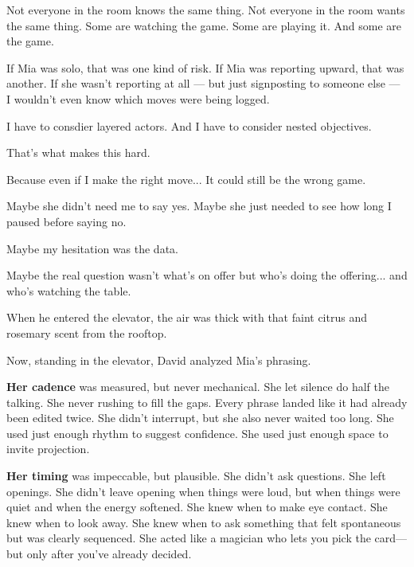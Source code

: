 \begin{tcolorbox}[
    enhanced,
    sharp corners,
    boxrule=0pt,
    colback=gray!3,
    borderline west={2pt}{0pt}{gray!60}, %
    left=10pt,
    right=10pt,
    top=6pt,
    bottom=6pt,
    width=\linewidth,
    fontupper=\small\itshape
  ]
Not everyone in the room knows the same thing.
Not everyone in the room wants the same thing.
Some are watching the game.
Some are playing it.
And some are the game.

\medskip

If Mia was solo, that was one kind of risk.
If Mia was reporting upward, that was another.
If she wasn’t reporting at all --- but just signposting to someone else --- I wouldn’t 
even know which moves were being logged.

\medskip

I have to consdier layered actors. 
And I have to consider nested objectives.

\medskip

That’s what makes this hard.

\medskip

Because even if I make the right move...
It could still be the wrong game.

\medskip

Maybe she didn’t need me to say yes.
Maybe she just needed to see how long I paused before saying no.

\medskip

Maybe my hesitation was the data.

\medskip

Maybe the real question wasn’t what’s on offer
but who’s doing the offering... and who’s watching the table.

\end{tcolorbox}

When he entered the elevator, the air was thick with that faint citrus and rosemary scent 
from the rooftop. 

Now, standing in the elevator, David analyzed Mia’s phrasing.

\textbf{Her cadence} was measured, but never mechanical.
She let silence do half the talking. She never rushing to fill the gaps.
Every phrase landed like it had already been edited twice.
She didn’t interrupt, but she also never waited too long.
She used just enough rhythm to suggest confidence.
She used just enough space to invite projection.


\textbf{Her timing} was impeccable, but plausible.
She didn’t ask questions. She left openings.
She didn't leave opening when things were loud, but when things were quiet
and when the energy softened.
She knew when to make eye contact. 
She knew when to look away. 
She knew when to ask something that felt spontaneous but was clearly sequenced.
She acted like a magician who lets you pick the card—but only after you've already decided.

